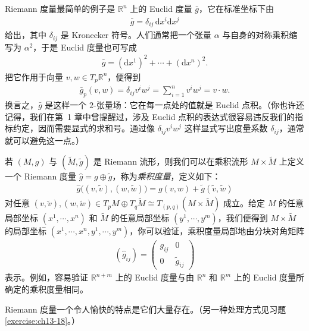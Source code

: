 \documentclass[../../main.tex]{subfiles}
\begin{document}
\begin{example}[Euclid 度量]\label{example:ch13-euclidean-metric}
Riemann 度量最简单的例子是 $\mathbb{R}^n$ 上的 Euclid 度量 $\bar g$，它在标准坐标下由
\begin{align*}
\bar g=\delta_{ij}\,\mathrm{d}x^i\mathrm{d}x^j
\end{align*}
给出，其中 $\delta_{ij}$ 是 Kronecker 符号。人们通常把一个张量 $\alpha$ 与自身的对称乘积缩写为 $\alpha^2$，于是 Euclid 度量也可写成
\begin{align*}
\bar g=(\mathrm{d}x^1)^2+\cdots+(\mathrm{d}x^n)^2.
\end{align*}
把它作用于向量 $v,w\in T_p\mathbb{R}^n$，便得到
\begin{align*}
\bar g_p(v,w)=\delta_{ij}v^iw^j=\sum_{i=1}^n v^iw^j=v\cdot w.
\end{align*}
换言之，$\bar g$ 是这样一个 $2$-张量场：它在每一点处的值就是 Euclid 点积。（你也许还记得，我们在第~1 章中曾提醒过，涉及 Euclid 点积的表达式很容易违反我们的指标约定，因而需要显式的求和号。通过像 $\delta_{ij}v^iw^j$ 这样显式写出度量系数 $\delta_{ij}$，通常就可以避免这一点。）
\end{example}

\begin{example}[乘积度量]\label{example:ch13-product-metrics}
若 $(M,g)$ 与 $(\widetilde M,\widetilde g)$ 是 Riemann 流形，则我们可以在乘积流形 $M\times\widetilde M$ 上定义一个 Riemann 度量 $\hat g=g\oplus\widetilde g$，称为\emph{乘积度量}，定义如下：
\begin{align}
\hat g\bigl((v,\widetilde v),(w,\widetilde w)\bigr)=g(v,w)+\widetilde g(\widetilde v,\widetilde w)
\end{align}
对任意 $(v,\widetilde v),(w,\widetilde w)\in T_pM\oplus T_q\widetilde M\cong T_{(p,q)}(M\times\widetilde M)$ 成立。给定 $M$ 的任意局部坐标 $(x^1,\cdots ,x^n)$ 和 $\widetilde M$ 的任意局部坐标 $(y^1,\cdots ,y^m)$，我们便得到 $M\times\widetilde M$ 的局部坐标 $(x^1,\cdots ,x^n,y^1,\cdots ,y^m)$，你可以验证，乘积度量局部地由分块对角矩阵
\begin{align*}
(\hat g_{ij})=
\begin{pmatrix}
g_{ij}&0\\
0&\widetilde g_{ij}
\end{pmatrix}
\end{align*}
表示。例如，容易验证 $\mathbb{R}^{n+m}$ 上的 Euclid 度量与由 $\mathbb{R}^n$ 和 $\mathbb{R}^m$ 上的 Euclid 度量所确定的乘积度量相同。
\end{example}

Riemann 度量一个令人愉快的特点是它们大量存在。（另一种处理方式见习题\ref{exercise:ch13-18}。）
\end{document}
